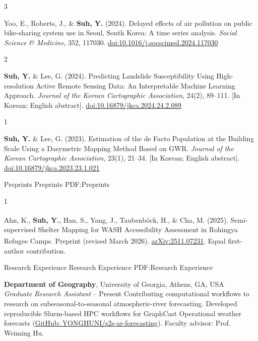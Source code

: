 \documentclass[letterpaper,MMMyyyy,nonstopmode]{simpleresumecv}
\newcommand{\PublicationItem}[2]{%
  \phantomsection\label{pub:#1}%
  \expandafter\gdef\csname pubnum:#1\endcsname{#2}%
  \NumberedItem{[#2]}%
}
\begin{document}
\begin{Body}
\BigGap
\Gap
\PublicationItem{bike-sharing-air-pollution}{3}
Yoo, E., Roberts, J., \& \textbf{Suh, Y.} (2024).
Delayed effects of air pollution on public bike-sharing system use in Seoul, South Korea: A time series analysis.
\textit{Social Science \& Medicine}, 352, 117030.
\href{https://doi.org/10.1016/j.socscimed.2024.117030}{\underline{doi:10.1016/j.socscimed.2024.117030}}

\BigGap
\PublicationItem{landslide-active-rs}{2}
\textbf{Suh, Y.} \& Lee, G. (2024).
Predicting Landslide Susceptibility Using High-resolution Active Remote Sensing Data:
An Interpretable Machine Learning Approach.
\textit{Journal of the Korean Cartographic Association}, 24(2), 89--111.
[In Korean; English abstract].
\href{https://journal.cartography.or.kr/articles/article/GmX8/}{\underline{doi:10.16879/jkca.2024.24.2.089}}

\BigGap
\PublicationItem{building-scale-population-gwr}{1}
\textbf{Suh, Y.} \& Lee, G. (2023).
Estimation of the de Facto Population at the Building Scale Using a Dasymetric Mapping Method Based on GWR.
\textit{Journal of the Korean Cartographic Association}, 23(1), 21--34.
[In Korean; English abstract].
\href{https://journal.cartography.or.kr/articles/article/Ad7w/}{\underline{doi:10.16879/jkca.2023.23.1.021}}

\BigGap
\SubSection
{Preprints}
{Preprints}
{PDF:Preprints}

\Gap
\PublicationItem{shelter-mapping-wash}{1}
Ahn, K.\textsuperscript{\dag}, \textbf{Suh, Y.}\textsuperscript{\dag},
Han, S., Yang, J., Taubenb\"ock, H., \& Cha, M. (2025).
Semi-supervised Shelter Mapping for WASH Accessibility Assessment in Rohingya Refugee Camps.
Preprint (revised March 2026). \href{https://arxiv.org/abs/2511.07231}{\underline{arXiv:2511.07231}}.
\textsuperscript{\dag}Equal first-author contribution.


\Section
{Research Experience}
{Research Experience}
{PDF:Research Experience}

\Entry
\textbf{Department of Geography}, University of Georgia, Athens, GA, USA
\Gap
\textit{       Graduate Research Assistant}
\hfill
{} -- Present
\Gap
\SubBulletItem
Contributing computational workflows to research on subseasonal-to-seasonal atmospheric-river forecasting.
\Gap
\SubBulletItem
Developed reproducible Slurm-based HPC workflows for GraphCast Operational weather forecasts (\href{https://github.com/YONGHUNI/s2s-ar-forecasting}{\underline{GitHub: YONGHUNI/s2s-ar-forecasting}}).
\Gap
\SubBulletItem
Faculty advisor: Prof. Weiming Hu.
\BigGap


\end{Body}
\end{document}
